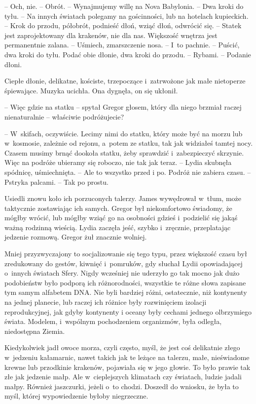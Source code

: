\documentclass[oneside,polish,12pt,sfheadings]{mwbk}
\begin{document}
-- Och, nie. -- Obrót. -- Wynajmujemy willę na Nova Babylonia. -- Dwa kroki
do tyłu. -- Na innych światach polegamy na gościnności, lub na hotelach
kupieckich. -- Krok do przodu, półobrót, podnieść dłoń, wziąć dłoń,
odwrócić się. -- Statek jest zaprojektowany dla krakenów, nie dla nas.
Większość wnętrza jest permanentnie zalana. -- Uśmiech, zmarszczenie
nosa. -- I~to pachnie. -- Puścić, dwa kroki do tyłu. Podać obie dłonie,
dwa kroki do przodu. -- Rybami. -- Podanie dłoni.

Ciepłe dłonie, delikatne, kościste, trzepoczące i~zatrwożone jak małe
nietoperze śpiewające. Muzyka ucichła. Ona dygnęła, on się ukłonił.

-- Więc gdzie na statku -- spytał Gregor głosem, który dla niego brzmiał
raczej nienaturalnie -- właściwie podróżujecie?

-- W~skifach, oczywiście. Lecimy nimi do statku, który może być na morzu
lub w~kosmosie, zależnie od rejonu, a~potem ze statku, tak jak widziałeś
tamtej nocy. Czasem musimy brnąć dookoła statku, żeby sprawdzić i~zabezpieczyć skrzynie. Więc na podróże ubieramy się roboczo, nie tak jak
teraz. -- Lydia skubnęła spódnicę, uśmiechnięta. -- Ale to wszystko przed
i po. Podróż nie zabiera czasu. -- Pstryka palcami. -- Tak po prostu.

Usiedli znowu koło ich porzuconych talerzy. James wywędrował w~tłum,
może taktycznie zostawiając ich samych. Gregor był niekomfortowo
świadomy, że mógłby wrócić, lub mógłby wziąć go na osobności gdzieś i~podzielić się jakąś ważną rodzinną wieścią. Lydia zaczęła jeść, szybko i~zręcznie, przeplatając jedzenie rozmową. Gregor żuł znacznie wolniej.

Mniej przyzwyczajony to socjalizowanie się tego typu, przez większość
czasu był zredukowany do gestów, kiwnięć i~pomruków, gdy słuchał Lydii
opowiadającej o~innych światach Sfery. Nigdy wcześniej nie uderzyło go
tak mocno jak dużo podobieństw było podporą ich różnorodności, wszystkie
te różne słowa zapisane tym samym alfabetem DNA. Nie byli bardziej
różni, ostatecznie, niż kontynenty na jednej planecie, lub raczej ich
różnice były rozwinięciem izolacji reprodukcyjnej, jak gdyby kontynenty
i oceany były cechami jednego olbrzymiego świata. Modelem, i~wspólnym
pochodzeniem organizmów, była odległa, niedostępna Ziemia.

Kiedykolwiek jadł owoce morza, czyli często, myśl, że jest coś
delikatnie złego w~jedzeniu kałamarnic, nawet takich jak te leżące na
talerzu, małe, nieświadome krewne lub przodkinie krakenów, pojawiała się
w jego głowie. To było prawie tak złe jak jedzenie małp. Ale w~cieplejszych klimatach czy światach, ludzie jadali małpy. Również
jaszczurki, jeżeli o~to chodzi. Doszedł do wniosku, że była to myśl,
której wypowiedzenie byłoby niegrzeczne.
\end{document}
